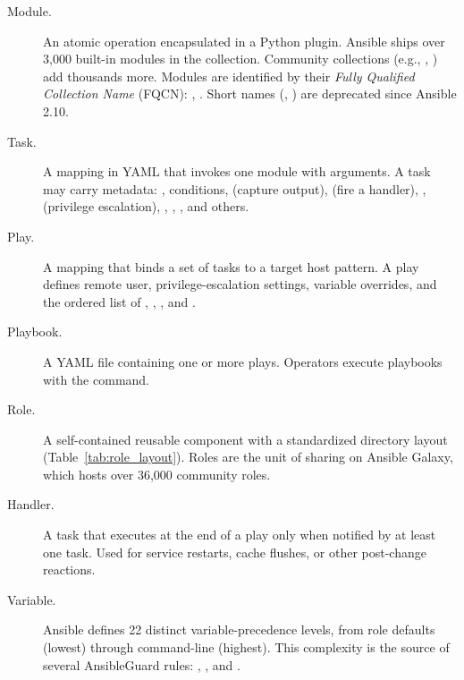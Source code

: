 \begin{description}
  \item[Module.] An atomic operation encapsulated in a Python plugin. Ansible
    ships over 3,000 built-in modules in the  collection.
    Community collections (e.g., , )
    add thousands more. Modules are identified by their \textit{Fully Qualified
    Collection Name} (\ac{FQCN}): ,
    . Short names (, )
    are deprecated since Ansible 2.10.

  \item[Task.] A mapping in \ac{YAML} that invokes one module with arguments.
    A task may carry metadata: ,  conditions,
     (capture output),  (fire a handler),
    ,  (privilege escalation), ,
    , , and others.

  \item[Play.] A mapping that binds a set of tasks to a target host pattern.
    A play defines remote user, privilege-escalation settings, variable
    overrides, and the ordered list of , ,
    , and .

  \item[Playbook.] A YAML file containing one or more plays. Operators execute
    playbooks with the  command.

  \item[Role.] A self-contained reusable component with a standardized
    directory layout (Table~\ref{tab:role_layout}). Roles are the unit of
    sharing on Ansible Galaxy\cite{ansible_galaxy}, which hosts over 36,000
    community roles.

  \item[Handler.] A task that executes at the end of a play only when notified
    by at least one task. Used for service restarts, cache flushes, or other
    post-change reactions.

  \item[Variable.] Ansible defines 22 distinct variable-precedence levels,
    from role defaults (lowest) through command-line 
    (highest). This complexity is the source of several AnsibleGuard rules:
    , , and
    .
\end{description}

